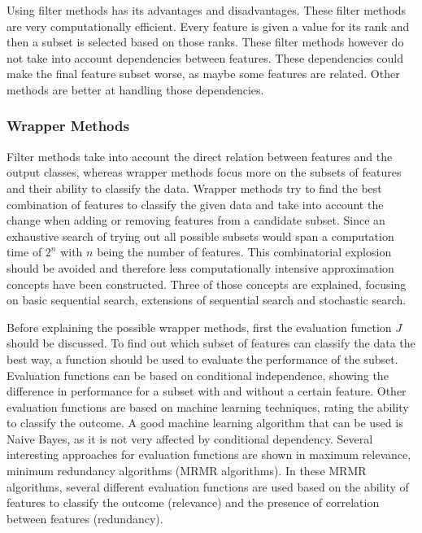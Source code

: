 	Using filter methods has its advantages and disadvantages. These filter methods are very computationally efficient. Every feature is given a value for its rank and then a subset is selected based on those ranks. These filter methods however do not take into account dependencies between features. These dependencies could make the final feature subset worse, as maybe some features are related. Other methods are better at handling those dependencies\cite{Duch2006, saeys2007review}.
	
	\subsubsection{Wrapper Methods}
	\label{subsec:WrapperMethods}
	
	Filter methods take into account the direct relation between features and the output classes, whereas wrapper methods focus more on the subsets of features and their ability to classify the data. Wrapper methods try to find the best combination of features to classify the given data and take into account the change when adding or removing features from a candidate subset\cite{Reunanen2006}. Since an exhaustive search of trying out all possible subsets would span a computation time of $2^n$ with $n$ being the number of features\cite{Alsallakh2016PowerSet}. This combinatorial explosion should be avoided and therefore less computationally intensive approximation concepts have been constructed. Three of those concepts are explained, focusing on basic sequential search, extensions of sequential search and stochastic search.
	
	Before explaining the possible wrapper methods, first the evaluation function $J$ should be discussed. To find out which subset of features can classify the data the best way, a function should be used to evaluate the performance of the subset\cite{Reunanen2006}. Evaluation functions can be based on conditional independence\cite{Reunanen2006,tsamardinos2017massively}, showing the difference in performance for a subset with and without a certain feature. Other evaluation functions are based on machine learning techniques\cite{huang2013automated, saeys2007review}, rating the ability to classify the outcome. A good machine learning algorithm that can be used is Naive Bayes, as it is not very affected by conditional dependency\cite{zhang2004optimality}. Several interesting approaches for evaluation functions are shown in maximum relevance, minimum redundancy algorithms\cite{SENAWI201747, el2009new, radovic2017minimum} (MRMR algorithms). In these MRMR algorithms, several different evaluation functions are used based on the ability of features to classify the outcome (relevance) and the presence of correlation between features (redundancy).
	

